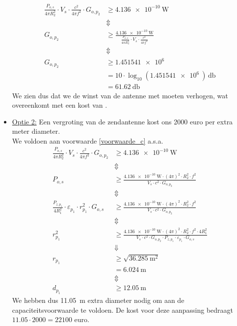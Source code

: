 \documentclass{kuburgiearticle}
\begin{document}
\begin{itemize}
		\begin{align*}
			\frac{P_{o,s}}{4\pi R_2^2} \cdot V_s \cdot \frac{c^2}{4\pi f^2}\cdot G_{o,p_2}& \geq \SI{4.136e-10}{\watt} \\
			& \Updownarrow \\
			G_{o,p_2} & \geq \frac{\SI{4.136e-10}{\watt}}{\frac{P_{o,s}}{4\pi R_2^2} \cdot V_s \cdot \frac{c^2}{4\pi f^2}} \\
			& \Updownarrow \\
			G_{o,p_2} & \geq \SI{1.451541e6}{} \\
					& = 10 \cdot \log_{10}(\SI{1.451541e6}{}) \,\unit{\decibel}\\
					& = \SI{61.62}{\decibel}
		\end{align*}
		We zien dus dat we de winst van de antenne met  moeten verhogen, wat overeenkomt met een kost van .

		\newpage
		\item \underline{Optie 2:} Een vergroting van de zendantenne kost ons 2000 euro per extra meter diameter. \\We voldoen aan voorwaarde \eqref{voorwaarde_c} a.s.a.
		\begin{align*}
			\frac{P_{o,s}}{4\pi R_2^2} \cdot V_s \cdot \frac{c^2}{4\pi f^2}\cdot G_{o,p_2}& \geq \SI{4.136e-10}{\watt} \\
			& \Updownarrow \\
			P_{o,s} &\geq \frac{\SI{4.136e-10}{\watt} \cdot (4\pi)^2 \cdot R_2^2 \cdot f^2}{V_s \cdot c^2 \cdot G_{o,p_2}} \\
			& \Updownarrow \\
			\frac{P_{z,p_1}}{4 R_1^2}\cdot \varepsilon_{p_1} \cdot  r_{p_1}^2 \cdot G_{o,s} &\geq \frac{\SI{4.136e-10}{\watt} \cdot (4\pi)^2 \cdot R_2^2 \cdot f^2}{V_s \cdot c^2 \cdot G_{o,p_2}} \\
			& \Updownarrow \\
			r_{p_1}^2 &\geq \frac{\SI{4.136e-10}{\watt} \cdot (4\pi)^2 \cdot R_2^2 \cdot f^2 \cdot 4R_1^2}{V_s \cdot c^2 \cdot G_{o,p_2} \cdot P_{z,p_1} \cdot \varepsilon_{p_1} \cdot G_{o,s} } \\
			& \Downarrow \\
			r_{p_1} &\geq \sqrt{\SI{36.285}{\meter^2}} \\
			&= \SI{6.024}{\meter}\\
			& \Updownarrow \\
			d_{p_1} &\geq \SI{12.05}{\meter}
		\end{align*}
		We hebben dus \SI{11.05}{\meter} extra diameter nodig om aan de capaciteitsvoorwaarde te voldoen. De kost voor deze aanpassing bedraagt \(11.05 \cdot 2000 = \boxed{22 100 \text{ euro}}\).


\end{itemize}
\end{document}
